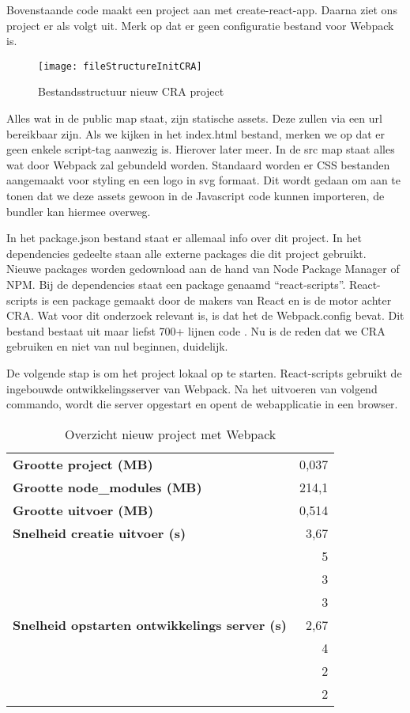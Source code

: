 

Bovenstaande code maakt een project aan met create-react-app. Daarna ziet ons project er als volgt uit. Merk op dat er geen configuratie bestand voor Webpack is.

\begin{figure}[h]
\texttt{[image: fileStructureInitCRA]}
   \centering
   \caption{Bestandsstructuur nieuw CRA project}
\end{figure}

Alles wat in de public map staat, zijn statische assets. Deze zullen via een url bereikbaar zijn. Als we kijken in het index.html bestand, merken we op dat er geen enkele script-tag aanwezig is. Hierover later meer.
In de src map staat alles wat door Webpack zal gebundeld worden. Standaard worden er CSS bestanden aangemaakt voor styling en een logo in svg formaat. Dit wordt gedaan om aan te tonen dat we deze assets gewoon in de Javascript code kunnen importeren, de bundler kan hiermee overweg.



In het package.json bestand staat er allemaal info over dit project. In het dependencies gedeelte staan alle externe packages die dit project gebruikt. Nieuwe packages worden gedownload aan de hand van Node Package Manager of NPM. Bij de dependencies staat een package genaamd “react-scripts”.
React-scripts \autocite{facebook-2018} is een package gemaakt door de makers van React en is de motor achter CRA.
Wat voor dit onderzoek relevant is, is dat het de Webpack.config bevat. Dit bestand bestaat uit maar liefst 700+ lijnen code \autocite{facebook-2021}. Nu is de reden dat we CRA gebruiken en niet van nul beginnen, duidelijk.

De volgende stap is om het project lokaal op te starten. React-scripts gebruikt de ingebouwde ontwikkelingsserver van Webpack. Na het uitvoeren van volgend commando, wordt die server opgestart en opent de webapplicatie in een browser.



\begin{table}[h]
   \centering
   \begin{tabular}{lr}
   \textbf{Grootte project (MB)} & 0,037 \\
   \textbf{Grootte node\_modules (MB)} & 214,1 \\
   \textbf{Grootte uitvoer (MB)} & 0,514 \\
   \textbf{Snelheid creatie uitvoer (s)} & 3,67 \\
   \textbf{} & 5 \\
   \textbf{} & 3 \\
   \textbf{} & 3 \\
   \textbf{Snelheid opstarten ontwikkelings server (s)} & 2,67 \\
   \textbf{} & 4 \\
   \textbf{} & 2 \\
   \textbf{} & 2
   \end{tabular}
   \caption{Overzicht nieuw project met Webpack}
   \end{table}


